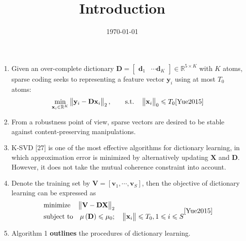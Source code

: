 \documentclass[onecolumn,conference]{IEEEtran}
\begin{document}
\title{Introduction}
\author{\today}
\maketitle
\begin{enumerate}
\item Given an over-complete dictionary $\mathbf{D}=\begin{bmatrix}
\mathbf{d}_1&\cdots\mathbf{d}_K
\end{bmatrix}\in \mathbb{R}^{5\times K}$ with $K$ atoms, sparse coding seeks to representing a feature vector $\mathbf{y}_i$ using at most $T_0$ atoms:
\begin{equation}
\min_{\mathbf{x}_i\in \mathbb{R}^K}
\begin{Vmatrix}
\mathbf{y}_i-\mathbf{D}\mathbf{x}_i
\end{Vmatrix}_2, \qquad \text{s.t.}\quad
\begin{Vmatrix}
\mathbf{x}_i
\end{Vmatrix}_0\leqslant T_0\cite{Yue2015}
\end{equation}
\item From a robustness point of view, sparse vectors are desired to be stable against content-preserving manipulations. \cite{Yue2015}
\item K-SVD [27] is one of the most effective algorithms for dictionary learning, in which approximation error is minimized by alternatively updating $\mathbf{X}$ and $\mathbf{D}$. However, it does not take the mutual coherence constraint into account. \cite{Yue2015}
\item Denote the training set by $\mathbf{V}=\left[\mathbf{v}_1,\cdots,\mathbf{v}_S\right]$, then the objective of dictionary learning can be expressed as
\begin{equation}
\begin{aligned}
&\text{minimize}\quad
\begin{Vmatrix}
\mathbf{V-DX}
\end{Vmatrix}_2\\
&\text{subject to} \quad \mu\left(\mathbf{D}\right)\leqslant\mu_0;\quad \begin{Vmatrix}
\mathbf{x}_i
\end{Vmatrix}\leqslant T_0,1\leqslant i\leqslant S
\end{aligned}\cite{Yue2015}
\end{equation}
\item Algorithm 1 \textbf{outlines} the procedures of dictionary learning. \cite{Yue2015}

\end{enumerate}
\end{document}
